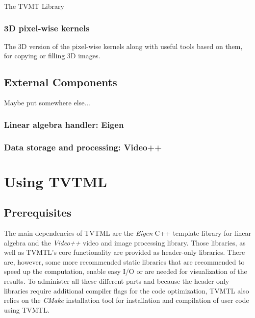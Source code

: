 \begin{chapter}{The TVMT Library}
\subsubsection{3D pixel-wise kernels} %
\label{ssub:3D pixel-wise kernels}
The 3D version of the pixel-wise kernels along with useful tools based on them, for copying or filling 3D images.



\subsection{External Components} %
\label{sub:External Components}
Maybe put somewhere else...
\subsubsection{Linear algebra handler: Eigen} %
\label{ssub:Eigen}


\subsubsection{Data storage and processing: Video++} %
\label{ssub:Video++}





\section{Using TVTML} %
\label{sec:Using TVTML}

\subsection{Prerequisites} %
\label{sub:Prerequisites}
The main dependencies of TVTML are the \textit{Eigen} C++ template library for linear algebra and the \textit{Video++} video and image processing library. 
Those libraries, as well as TVMTL's core functionality are provided as header-only libraries. There are, however, some more recommended static libraries
that are recommended to speed up the computation, enable easy I/O or are needed for visualization of the results.
To administer all these different parts and because the header-only libraries require additional compiler flags for the code optimization, TVMTL also relies
on the \textit{CMake} installation tool for installation and compilation of user code using TVMTL. \\


\end{chapter}
